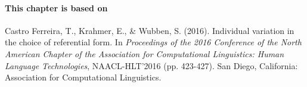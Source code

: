 \paragraph{This chapter is based on} Castro Ferreira, T., Krahmer, E., \& Wubben, S. (2016). Individual variation in the choice of referential form. In \textit{Proceedings of the 2016 Conference of the North American Chapter of the Association for Computational Linguistics: Human Language Technologies}, NAACL-HLT'2016 (pp. 423-427). San Diego, California: Association for Computational Linguistics.

\newpage





%










%
%

%



%

